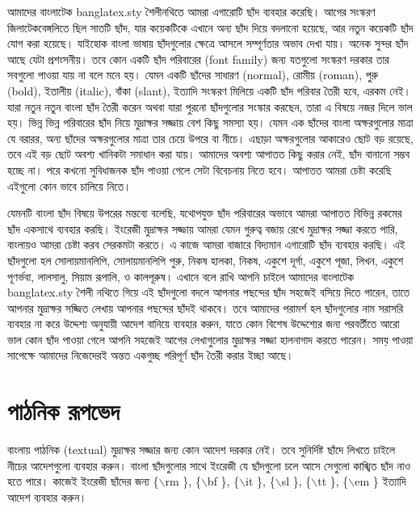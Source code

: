 \documentclass[a4paper,10pt,xetex]{article}
\begin{document}
আমাদের বাংলাটেক banglatex.sty শৈলীনথিতে আমরা এগারোটি ছাঁদ ব্যবহার করেছি। আগের সংস্করণ জিলাটেকবেঙ্গলিতে ছিল সাতটি ছাঁদ, যার কয়েকটিকে এখানে অন্য ছাঁদ দিয়ে বদলানো হয়েছে, আর নতুন কয়েকটি ছাঁদ যোগ করা হয়েছে। যাইহোক বাংলা ভাষায় ছাঁদগুলোর ক্ষেত্রে আসলে সম্পূর্ণতার অভাব দেখা যায়। অনেক সুন্দর ছাঁদ আছে যেটা প্রশংসনীয়। তবে কোন একটি ছাঁদ পরিবারের (font family) জন্য যতগুলো সংস্করণ দরকার তার সবগুলো পাওয়া যায় না বলে মনে হয়। যেমন একটি ছাঁদের সাধারণ (normal), রোমীয় (roman), পুরু (bold), ইতালীয় (italic), বাঁকা (slant), ইত্যাদি সংস্করণ মিলিয়ে একটি ছাঁদ পরিবার তৈরী হবে, এরকম নেই। যারা নতুন নতুন বাংলা ছাঁদ তৈরী করেন অথবা যারা পুরনো ছাঁদগুলোর সংস্কার করছেন, তারা এ বিষয়ে নজর দিলে ভাল হয়। ভিন্ন ভিন্ন পরিবারের ছাঁদ নিয়ে মুদ্রাক্ষর সজ্জায় বেশ কিছু সমস্যা হয়। যেমন এক ছাঁদের বাংলা অক্ষরগুলোর মাত্রা যে বরারর, অন্য ছাঁদের অক্ষরগুলোর মাত্রা তার চেয়ে উপরে বা নীচে। এছাড়া অক্ষরগুলোর আকারেও ছোট বড় রয়েছে, তবে এই বড় ছোট অবশ্য খানিকটা সমাধান করা যায়। আমাদের অবশ্য আপাতত কিছু করার নেই, ছাঁদ বানানো সম্ভব হচ্ছে না। পরে কখনো সুবিধাজনক ছাঁদ পাওয়া গেলে সেটা বিবেচনায় নিতে হবে। আপাতত আমরা চেষ্টা করেছি এইগুলো কোন ভাবে চালিয়ে নিতে। 

যেমনটি বাংলা ছাঁদ বিষয়ে উপরের মন্তব্যে বলেছি, যথোপযুক্ত ছাঁদ পরিবারের অভাবে আমরা আপাতত বিভিন্ন রকমের ছাঁদ একসাথে ব্যবহার করছি। ইংরেজী মুদ্রাক্ষর সজ্জায় আমরা যেমন গুরুত্ব বজায় রেখে মুদ্রাক্ষর সজ্জা করতে পারি, বাংলায়ও আমরা চেষ্টা করব সেরকমটা করতে। এ কাজে আমরা বাজারে বিদ্যমান এগারোটি ছাঁদ ব্যবহার করছি। এই ছাঁদগুলো হল সোলায়মানলিপি, সোলায়মানলিপি পুরু, নিকষ হালকা, নিকষ, একুশে দূর্গা, একুশে পূজা, লিখন, একুশে পূণর্ভবা, লালসালু, সিয়াম রূপালি, ও কালপূরুষ। এখানে বলে রাখি আপনি চাইলে আমাদের বাংলাটেক banglatex.sty শৈলী নথিতে গিয়ে এই ছাঁদগুলো বদলে আপনার পছন্দের ছাঁদ সহজেই বসিয়ে দিতে পারেন, তাতে আপনার মুদ্রাক্ষর সজ্জিত লেখায় আপনার পছন্দের ছাঁদই থাকবে। তবে আমাদের পরামর্শ হল ছাঁদগুলোর নাম সরাসরি ব্যবহার না করে উদ্দেশ্য অনুযায়ী আদেশ বানিয়ে ব্যবহার করুন, যাতে কোন বিশেষ উদ্দেশ্যের জন্য পরবর্তীতে আরো ভাল কোন ছাঁদ পাওয়া গেলে আপনি সহজেই আগের লেখাগুলোর মুদ্রাক্ষর সজ্জা হালনাগাদ করতে পারেন।  সময় পাওয়া সাপেক্ষে আমাদের নিজেদেরই অন্তত একগুচ্ছ পরিপূর্ণ ছাঁদ তৈরী করার ইচ্ছা আছে। 

\section{পাঠনিক রূপভেদ}

বাংলায় পাঠনিক (textual) মুদ্রাক্ষর সজ্জার জন্য কোন আদেশ দরকার নেই। তবে সুনির্দিষ্ট ছাঁদে লিখতে চাইলে নীচের আদেশগুলো ব্যবহার করুন। বাংলা ছাঁদগুলোর সাথে ইংরেজী যে ছাঁদগুলো চলে আসে সেগুলো কাঙ্খিত ছাঁদ নাও হতে পারে। কাজেই ইংরেজী ছাঁদের জন্য \{$\backslash$rm ‌‌\}, \{$\backslash$bf ‌‌\}, \{$\backslash$it ‌‌\}, \{$\backslash$sl ‌‌\}, \{$\backslash$tt ‌‌\}, \{$\backslash$em ‌‌\} ইত্যাদি আদেশ ব্যবহার করুন।
\end{document}
